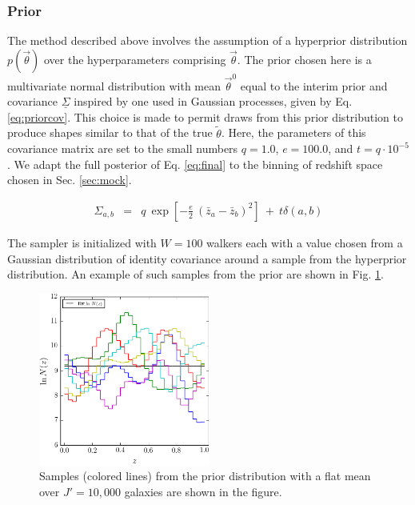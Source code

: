 \documentclass[preprint]{aastex}
\newcommand{\textul}{\underline}
\begin{document}
\clearpage
\subsubsection{Prior}
\label{sec:prior}

The method described above involves the assumption of a hyperprior distribution 
$p(\vec{\theta})$ over the hyperparameters comprising $\vec{\theta}$.  The 
prior chosen here is a multivariate normal distribution with mean 
$\vec{\theta}^{0}$ equal to the interim prior and covariance $\textul{\Sigma}$ 
inspired by one used in Gaussian processes, given by Eq. \ref{eq:priorcov}.  
This choice is made to permit draws from this prior distribution to produce 
shapes similar to that of the true $\tilde{\theta}$.  Here, the parameters of 
this covariance matrix are set to the small numbers $q=1.0$, $e=100.0$, and 
$t=q\cdot10^{-5}$.  We adapt the full posterior of Eq. \ref{eq:final} to the 
binning of redshift space chosen in Sec. \ref{sec:mock}.

\begin{eqnarray}
\label{eq:priorcov}
\Sigma_{a,b} &=& q\ \exp[-\frac{e}{2}\ (\bar{z}_{a}-\bar{z}_{b})^{2}]\ +\ 
t\delta(a,b)%
\end{eqnarray}

The sampler is initialized with $W=100$ walkers each with a value chosen from a 
Gaussian distribution of identity covariance around a sample from the 
hyperprior distribution.  An example of such samples from the prior are shown 
in Fig. \ref{fig:prior}.

\begin{figure}
\includegraphics[width=0.5\textwidth]{figs/null/priorsamps.png}
\caption{Samples (colored lines) from the prior distribution with a flat mean 
over $J'=10,000$ galaxies are shown in the figure.}
\label{fig:prior}
\end{figure}
\end{document}

